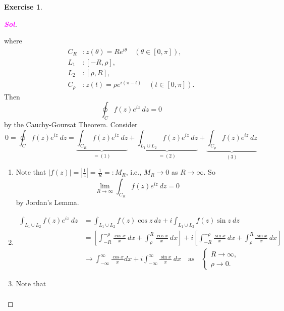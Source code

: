 \documentclass[12pt,openany]{book}
\theoremstyle{definition}
\newtheorem{exercise}{Exercise}[section]
\newcommand{\abs}[1]{\left\lvert #1 \right\rvert}
\newcommand{\sol}{\textcolor{magenta}{\bf Sol}}
\newcommand{\ie}{\textnormal{i.e.}}
\begin{document}
\begin{exercise}
\begin{enumerate}
\begin{proof}[\sol]
\begin{center}
				\end{center} where \begin{align*}
					C_R&: z(\theta)=Re^{i\theta}\quad(\theta\in[0,\pi]),\\
					L_1&: [-R,\rho],\\
					L_2&: [\rho,R],\\
					C_\rho&: z(t)=\rho e^{i(\pi-t)}\quad(t\in[0,\pi]).
				\end{align*} Then \[
				\oint_C f(z)e^{iz}\ dz=0
				\] by the Cauchy-Goursat Theorem. Consider \[
				0=\oint_C f(z)e^{iz}\ dz=\underbrace{\int_{C_R}f(z)e^{iz}\ dz}_{=(1)}+\underbrace{\int_{L_1\cup L_2}f(z)e^{iz}\ dz}_{=(2)}+\underbrace{\int_{C_\rho}f(z)e^{iz}\ dz}_{(3)}
				\] \begin{enumerate}[(1)]
					\item Note that $\abs{f(z)}=\abs{\frac{1}{z}}=\frac{1}{R}=:M_R$, \ie, $M_R\to 0$ as $R\to\infty$. So \[
					\lim\limits_{R\to\infty}\int_{C_R}f(z)e^{iz}\ dz=0
					\] by Jordan's Lemma.
					\item \begin{align*}
						\int_{L_1\cup L_2}f(z)e^{iz}\ dz&=\int_{L_1\cup L_2}f(z)\cos z\ dz+i\int_{L_1\cup L_2}f(z)\sin z\ dz\\
						&=\left[\int_{-R}^{-\rho}\frac{\cos x}{x}\ dx+\int_{\rho}^{R}\frac{\cos x}{x}\ dx\right]+i\left[\int_{-R}^{-\rho}\frac{\sin x}{x}\ dx+\int_{\rho}^{R}\frac{\sin x}{x}\ dx\right]\\
						&\to \int_{-\infty}^{\infty}\frac{\cos x}{x}dx + i\int_{-\infty}^{\infty}\frac{\sin x}{x}\ dx\quad\text{as}\quad\begin{cases}
							R\to\infty,\\
							\rho\to 0.
						\end{cases}
					\end{align*}
					\item Note that \begin{align*}

\end{align*}
\end{enumerate}
\end{proof}
\end{enumerate}
\end{exercise}
\end{document}
